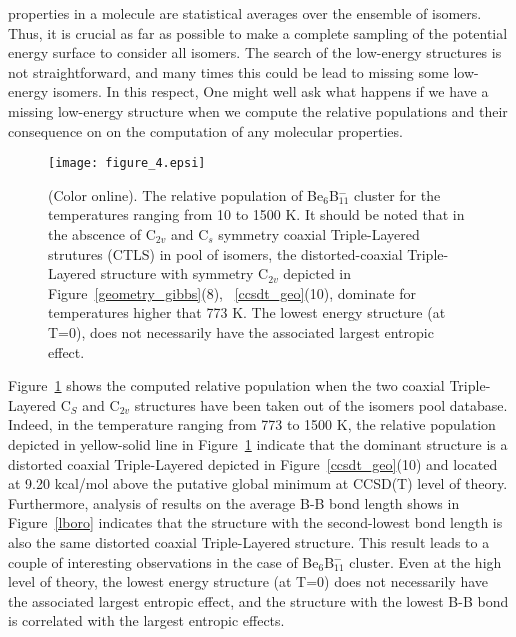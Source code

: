 \documentclass[prb,aps,preprint,showkeys,showpacs]{revtex4}
\begin{document}
properties in a molecule are statistical averages over the ensemble of isomers. Thus, it is crucial as far as possible to make a complete sampling of the potential energy surface to consider all isomers. The search of the low-energy structures is not straightforward, and many times this could be lead to missing some low-energy isomers. In this respect, One might well ask what happens if we have a missing low-energy structure when we compute the relative populations and their consequence on on the computation of any molecular properties.
\begin{figure}[ht!]
  \begin{center}  
    \texttt{[image: figure\_4.epsi]}
    \caption{(Color online). The relative population of Be$_6$B$_{11}^{-}$ cluster for the temperatures ranging from 10 to 1500 K.
      It should be noted that in the abscence of C$_{2v}$ and C$_s$ symmetry coaxial Triple-Layered strutures (CTLS) in pool of isomers, the distorted-coaxial Triple-Layered structure with symmetry  C$_{2v}$ depicted in Figure~\ref{geometry_gibbs}(8), ~\ref{ccsdt_geo}(10), dominate for temperatures higher that 773 K. The lowest energy structure (at T=0), does not necessarily have the associated largest entropic effect.}
      \label{popu3}
  \end{center}
  \end{figure}
Figure~\ref{popu3} shows the computed relative population when the two coaxial Triple-Layered  C$_S$ and C$_{2v}$ structures have been taken out of the isomers pool database. Indeed,  in the temperature ranging from 773 to 1500 K, the relative population depicted in yellow-solid line in Figure~\ref{popu3} indicate   that the dominant structure is a distorted coaxial Triple-Layered depicted in Figure~\ref{ccsdt_geo}(10) and located at 9.20 kcal/mol above the putative global minimum at CCSD(T) level of theory.  Furthermore, analysis of results on the average B-B bond length shows in Figure~\ref{lboro} indicates that the structure with the second-lowest bond length is also the same distorted coaxial Triple-Layered structure.
This result leads to a couple of interesting observations in the case of Be$_6$B$_{11}^{-}$ cluster. Even at the high level of theory, the lowest energy structure (at T=0) does not necessarily have the associated largest entropic effect, and the structure with the lowest B-B bond is correlated with the largest entropic effects.
\end{document}
